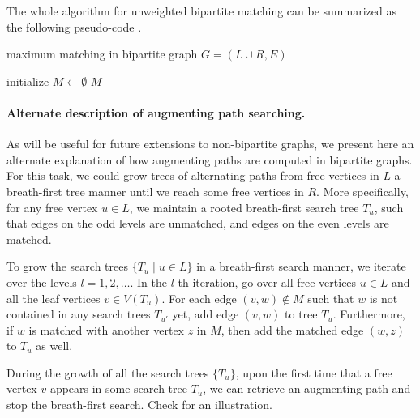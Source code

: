 The whole algorithm for unweighted bipartite matching can be summarized as the following pseudo-code .

\begin{algorithm}
	\caption{maximum matching in bipartite graph $G = (L\cup R, E)$}\label{bipartite-mcm}
	initialize $M\leftarrow \emptyset$\;
	\Return $M$\;
\end{algorithm}

\paragraph{Alternate description of augmenting path searching.} As will be useful for future extensions to non-bipartite graphs, we present here an alternate explanation of how augmenting paths are computed in bipartite graphs. For this task, we could grow trees of alternating paths from free vertices in $L$ a breath-first tree manner until we reach some free vertices in $R$. More specifically, for any free vertex $u\in L$, we maintain a rooted breath-first search tree $T_u$, such that edges on the odd levels are unmatched, and edges on the even levels are matched.

To grow the search trees $\{T_u\mid u\in L\}$ in a breath-first search manner, we iterate over the levels $l = 1, 2, \ldots$. In the $l$-th iteration, go over all free vertices $u\in L$ and all the leaf vertices $v\in V(T_u)$. For each edge $(v, w)\notin M$ such that $w$ is not contained in any search trees $T_{u'}$ yet, add edge $(v, w)$ to tree $T_u$. Furthermore, if $w$ is matched with another vertex $z$ in $M$, then add the matched edge $(w, z)$ to $T_u$ as well.

During the growth of all the search trees $\{T_u\}$, upon the first time that a free vertex $v$ appears in some search tree $T_u$, we can retrieve an augmenting path and stop the breath-first search. Check  for an illustration.

